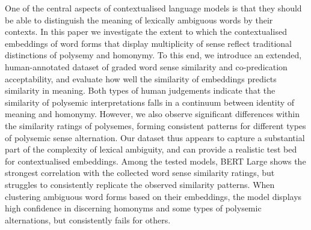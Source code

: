 One of the central aspects of contextualised language models is that they should be able to distinguish the meaning of lexically ambiguous words by their contexts. In this paper we investigate the extent to which the contextualised embeddings of word forms that display multiplicity of sense reflect traditional distinctions of polysemy and homonymy. To this end, we introduce an extended, human-annotated dataset of graded word sense similarity and co-predication acceptability, and evaluate how well the similarity of embeddings predicts similarity in meaning. Both types of human judgements indicate that the similarity of polysemic interpretations falls in a continuum between identity of meaning and homonymy. However, we also observe significant differences within the similarity ratings of polysemes, forming consistent patterns for different types of polysemic sense alternation. Our dataset thus appears to capture a substantial part of the complexity of lexical ambiguity, and can provide a realistic test bed for contextualised embeddings. Among the tested models, BERT Large shows the strongest correlation with the collected word sense similarity ratings, but struggles to consistently replicate the observed similarity patterns. When clustering ambiguous word forms based on their embeddings, the model displays high confidence in discerning homonyms and some types of polysemic alternations, but consistently fails for others.

